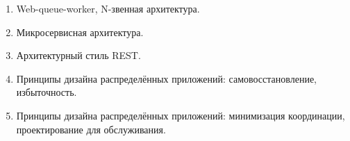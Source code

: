 \documentclass[a5paper]{article}
\begin{document}
\begin{enumerate}
    \item Web-queue-worker, N-звенная архитектура.
    \item Микросервисная архитектура.
    \item Архитектурный стиль REST.
    \item Принципы дизайна распределённых приложений: самовосстановление, избыточность.
    \item Принципы дизайна распределённых приложений: минимизация координации, проектирование для обслуживания.
\end{enumerate}
\end{document}
